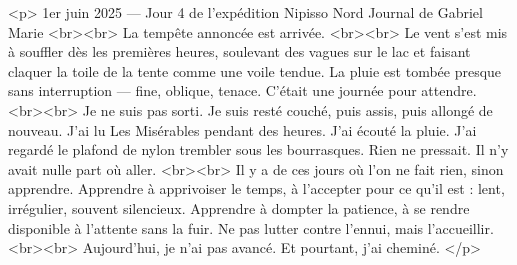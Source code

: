 <p>
1er juin 2025 — Jour 4 de l’expédition Nipisso Nord
Journal de Gabriel Marie
<br><br>
La tempête annoncée est arrivée.
<br><br>
Le vent s’est mis à souffler dès les premières heures, soulevant des vagues sur le lac et faisant claquer la toile de la tente comme une voile tendue. La pluie est tombée presque sans interruption — fine, oblique, tenace. C’était une journée pour attendre.
<br><br>
Je ne suis pas sorti. Je suis resté couché, puis assis, puis allongé de nouveau. J’ai lu Les Misérables pendant des heures. J’ai écouté la pluie. J’ai regardé le plafond de nylon trembler sous les bourrasques. Rien ne pressait. Il n’y avait nulle part où aller.
<br><br>
Il y a de ces jours où l’on ne fait rien, sinon apprendre. Apprendre à apprivoiser le temps, à l’accepter pour ce qu’il est : lent, irrégulier, souvent silencieux. Apprendre à dompter la patience, à se rendre disponible à l’attente sans la fuir. Ne pas lutter contre l’ennui, mais l’accueillir.
<br><br>
Aujourd’hui, je n’ai pas avancé. Et pourtant, j’ai cheminé.
</p>



